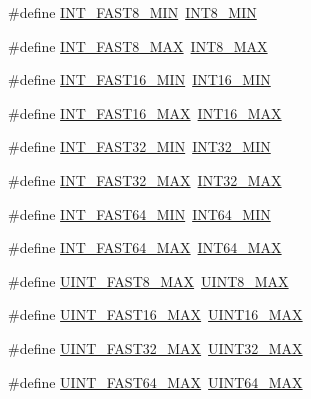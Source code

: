 \begin{DoxyCompactItemize}
\#define \hyperlink{a00119_aad8fb982cb19143efd5ee9a1a7a89390}{I\+N\+T\+\_\+\+F\+A\+S\+T8\+\_\+\+M\+IN}~\hyperlink{a00119_aadcf2a81af243df333b31efa6461ab8e}{I\+N\+T8\+\_\+\+M\+IN}
\item 
\#define \hyperlink{a00119_acbcdb3bee0f5f904da5df8de69a80ca3}{I\+N\+T\+\_\+\+F\+A\+S\+T8\+\_\+\+M\+AX}~\hyperlink{a00119_aaf7f29f45f1a513b4748a4e5014ddf6a}{I\+N\+T8\+\_\+\+M\+AX}
\item 
\#define \hyperlink{a00119_a169460a4e2a79138723d68d99372d958}{I\+N\+T\+\_\+\+F\+A\+S\+T16\+\_\+\+M\+IN}~\hyperlink{a00119_ad4e9955955b27624963643eac448118a}{I\+N\+T16\+\_\+\+M\+IN}
\item 
\#define \hyperlink{a00119_a2fd35d0ea091e04caec504ff0042cf00}{I\+N\+T\+\_\+\+F\+A\+S\+T16\+\_\+\+M\+AX}~\hyperlink{a00119_ac58f2c111cc9989c86db2a7dc4fd84ca}{I\+N\+T16\+\_\+\+M\+AX}
\item 
\#define \hyperlink{a00119_ad93df1652ed0635513d5efe4f1219926}{I\+N\+T\+\_\+\+F\+A\+S\+T32\+\_\+\+M\+IN}~\hyperlink{a00119_a688eb21a22db27c2b2bd5836943cdcbe}{I\+N\+T32\+\_\+\+M\+IN}
\item 
\#define \hyperlink{a00119_ac96fa0f41b19e89f109e4f9913ca6635}{I\+N\+T\+\_\+\+F\+A\+S\+T32\+\_\+\+M\+AX}~\hyperlink{a00119_a181807730d4a375f848ba139813ce04f}{I\+N\+T32\+\_\+\+M\+AX}
\item 
\#define \hyperlink{a00119_a50f0fdcb00ea2500cec0f3d6d45c36f3}{I\+N\+T\+\_\+\+F\+A\+S\+T64\+\_\+\+M\+IN}~\hyperlink{a00119_ab21f12f372f67b8ff0aa3432336ede67}{I\+N\+T64\+\_\+\+M\+IN}
\item 
\#define \hyperlink{a00119_a13c95cf9c209d8daacb36cbf0d5ba275}{I\+N\+T\+\_\+\+F\+A\+S\+T64\+\_\+\+M\+AX}~\hyperlink{a00119_ad0d744f05898e32d01f73f8af3cd2071}{I\+N\+T64\+\_\+\+M\+AX}
\item 
\#define \hyperlink{a00119_a2c6f97ea2d76d0cf6260c84046cdb44e}{U\+I\+N\+T\+\_\+\+F\+A\+S\+T8\+\_\+\+M\+AX}~\hyperlink{a00119_aeb4e270a084ee26fe73e799861bd0252}{U\+I\+N\+T8\+\_\+\+M\+AX}
\item 
\#define \hyperlink{a00119_aed28ca63d9b222f6f1377358fe73a183}{U\+I\+N\+T\+\_\+\+F\+A\+S\+T16\+\_\+\+M\+AX}~\hyperlink{a00119_a3ea490c9b3617d4479bd80ef93cd5602}{U\+I\+N\+T16\+\_\+\+M\+AX}
\item 
\#define \hyperlink{a00119_ad51246a178143208b2db3315efd21c45}{U\+I\+N\+T\+\_\+\+F\+A\+S\+T32\+\_\+\+M\+AX}~\hyperlink{a00119_ab5eb23180f7cc12b7d6c04a8ec067fdd}{U\+I\+N\+T32\+\_\+\+M\+AX}
\item 
\#define \hyperlink{a00119_aeb74410af7781bc84b5f64ae7a8f4a17}{U\+I\+N\+T\+\_\+\+F\+A\+S\+T64\+\_\+\+M\+AX}~\hyperlink{a00119_a30654b4b67d97c42ca3f9b6052dda916}{U\+I\+N\+T64\+\_\+\+M\+AX}

\end{DoxyCompactItemize}
